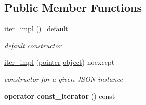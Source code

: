 \subsection*{Public Member Functions}
\begin{DoxyCompactItemize}
\item 
\hyperlink{classnlohmann_1_1basic__json_1_1iter__impl_a3e45be67e4384b3eacb72bd6147a6a91}{iter\+\_\+impl} ()=default\hypertarget{classnlohmann_1_1basic__json_1_1iter__impl_a3e45be67e4384b3eacb72bd6147a6a91}{}\label{classnlohmann_1_1basic__json_1_1iter__impl_a3e45be67e4384b3eacb72bd6147a6a91}

\begin{DoxyCompactList}\small\item\em default constructor \end{DoxyCompactList}\item 
\hyperlink{classnlohmann_1_1basic__json_1_1iter__impl_aa496f5348569e75d65592f25e1664770}{iter\+\_\+impl} (\hyperlink{classnlohmann_1_1basic__json_1_1iter__impl_a3dddd7fa38b36e2531700ceb4a1ce9a8}{pointer} \hyperlink{classnlohmann_1_1basic__json_a9f42ee7d10eee2d5a73fd94ca7f767ca}{object}) noexcept
\begin{DoxyCompactList}\small\item\em constructor for a given J\+S\+ON instance \end{DoxyCompactList}\item 
{\bfseries operator const\+\_\+iterator} () const \hypertarget{classnlohmann_1_1basic__json_1_1iter__impl_a3d42252a98141557f61e2ceb1cb7f06f}{}\label{classnlohmann_1_1basic__json_1_1iter__impl_a3d42252a98141557f61e2ceb1cb7f06f}


\end{DoxyCompactItemize}
